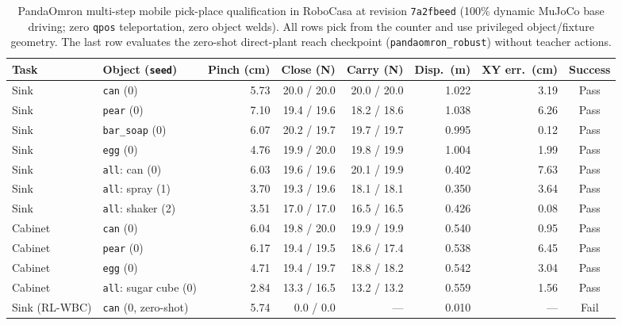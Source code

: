 \begin{table}[t]
  \centering
  \caption{PandaOmron multi-step mobile pick-place qualification in RoboCasa at revision \texttt{7a2fbeed} (100\% dynamic MuJoCo base driving; zero \texttt{qpos} teleportation, zero object welds). All rows pick from the counter and use privileged object/fixture geometry. The last row evaluates the zero-shot direct-plant reach checkpoint (\texttt{pandaomron\_robust}) without teacher actions.}
  \label{tab:robocasa_pandaomron_pick_place}
  \small
  \setlength{\tabcolsep}{2.75pt}
  \begin{tabular}{@{}llrrrrrc@{}}
    \toprule
    Task & Object (\texttt{seed}) & Pinch (cm) & Close (N) & Carry (N) & Disp.\ (m) & XY err.\ (cm) & Success \\
    \midrule
    Sink & \texttt{can} (0) & 5.73 & 20.0 / 20.0 & 20.0 / 20.0 & 1.022 & 3.19 & Pass \\
    Sink & \texttt{pear} (0) & 7.10 & 19.4 / 19.6 & 18.2 / 18.6 & 1.038 & 6.26 & Pass \\
    Sink & \texttt{bar\_soap} (0) & 6.07 & 20.2 / 19.7 & 19.7 / 19.7 & 0.995 & 0.12 & Pass \\
    Sink & \texttt{egg} (0) & 4.76 & 19.9 / 20.0 & 19.8 / 19.9 & 1.004 & 1.99 & Pass \\
    Sink & \texttt{all}: can (0) & 6.03 & 19.6 / 19.6 & 20.1 / 19.9 & 0.402 & 7.63 & Pass \\
    Sink & \texttt{all}: spray (1) & 3.70 & 19.3 / 19.6 & 18.1 / 18.1 & 0.350 & 3.64 & Pass \\
    Sink & \texttt{all}: shaker (2) & 3.51 & 17.0 / 17.0 & 16.5 / 16.5 & 0.426 & 0.08 & Pass \\
    \midrule
    Cabinet & \texttt{can} (0) & 6.04 & 19.8 / 20.0 & 19.9 / 19.9 & 0.540 & 0.95 & Pass \\
    Cabinet & \texttt{pear} (0) & 6.17 & 19.4 / 19.5 & 18.6 / 17.4 & 0.538 & 6.45 & Pass \\
    Cabinet & \texttt{egg} (0) & 4.71 & 19.4 / 19.7 & 18.8 / 18.2 & 0.542 & 3.04 & Pass \\
    Cabinet & \texttt{all}: sugar cube (0) & 2.84 & 13.3 / 16.5 & 13.2 / 13.2 & 0.559 & 1.56 & Pass \\
    \midrule
    Sink (RL-WBC) & \texttt{can} (0, zero-shot) & 5.74 & 0.0 / 0.0 & --- & 0.010 & --- & Fail \\
    \bottomrule
  \end{tabular}
\end{table}

